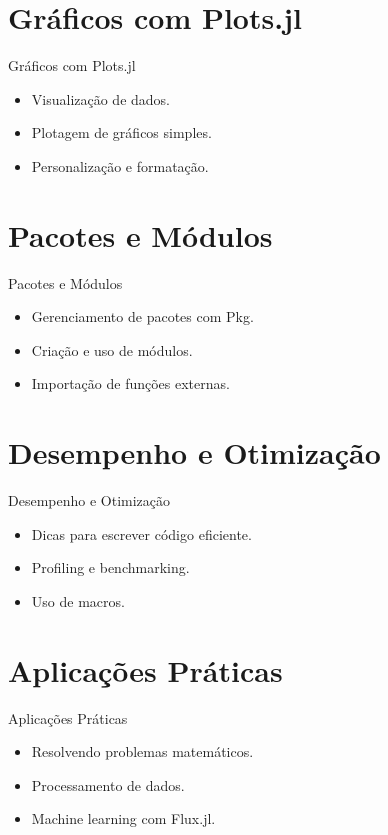 \documentclass{beamer}
\begin{document}
\section{Gráficos com Plots.jl}
\begin{frame}{Gráficos com Plots.jl}
    \begin{itemize}
        \item Visualização de dados.
        \item Plotagem de gráficos simples.
        \item Personalização e formatação.
    \end{itemize}
\end{frame}

\section{Pacotes e Módulos}
\begin{frame}{Pacotes e Módulos}
    \begin{itemize}
        \item Gerenciamento de pacotes com Pkg.
        \item Criação e uso de módulos.
        \item Importação de funções externas.
    \end{itemize}
\end{frame}

\section{Desempenho e Otimização}
\begin{frame}{Desempenho e Otimização}
    \begin{itemize}
        \item Dicas para escrever código eficiente.
        \item Profiling e benchmarking.
        \item Uso de macros.
    \end{itemize}
\end{frame}

\section{Aplicações Práticas}
\begin{frame}{Aplicações Práticas}
    \begin{itemize}
        \item Resolvendo problemas matemáticos.
        \item Processamento de dados.
        \item Machine learning com Flux.jl.
    \end{itemize}
\end{frame}
\end{document}
